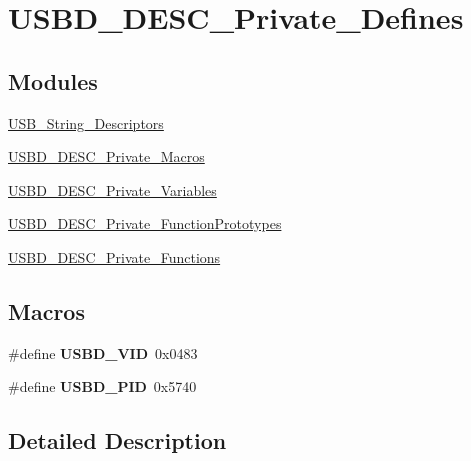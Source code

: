 \hypertarget{group__USBD__DESC__Private__Defines}{\section{U\-S\-B\-D\-\_\-\-D\-E\-S\-C\-\_\-\-Private\-\_\-\-Defines}
\label{group__USBD__DESC__Private__Defines}
}
\subsection*{Modules}
\begin{DoxyCompactItemize}
\item 
\hyperlink{group__USB__String__Descriptors}{U\-S\-B\-\_\-\-String\-\_\-\-Descriptors}
\item 
\hyperlink{group__USBD__DESC__Private__Macros}{U\-S\-B\-D\-\_\-\-D\-E\-S\-C\-\_\-\-Private\-\_\-\-Macros}
\item 
\hyperlink{group__USBD__DESC__Private__Variables}{U\-S\-B\-D\-\_\-\-D\-E\-S\-C\-\_\-\-Private\-\_\-\-Variables}
\item 
\hyperlink{group__USBD__DESC__Private__FunctionPrototypes}{U\-S\-B\-D\-\_\-\-D\-E\-S\-C\-\_\-\-Private\-\_\-\-Function\-Prototypes}
\item 
\hyperlink{group__USBD__DESC__Private__Functions}{U\-S\-B\-D\-\_\-\-D\-E\-S\-C\-\_\-\-Private\-\_\-\-Functions}
\end{DoxyCompactItemize}
\subsection*{Macros}
\begin{DoxyCompactItemize}
\item 
\hypertarget{group__USBD__DESC__Private__Defines_gac5251397ce2246b546b472cd802e6d62}{\#define {\bfseries U\-S\-B\-D\-\_\-\-V\-I\-D}~0x0483}\label{group__USBD__DESC__Private__Defines_gac5251397ce2246b546b472cd802e6d62}

\item 
\hypertarget{group__USBD__DESC__Private__Defines_ga287c940e33c18a7f0fda473a8f15b0d0}{\#define {\bfseries U\-S\-B\-D\-\_\-\-P\-I\-D}~0x5740}\label{group__USBD__DESC__Private__Defines_ga287c940e33c18a7f0fda473a8f15b0d0}

\end{DoxyCompactItemize}


\subsection{Detailed Description}

